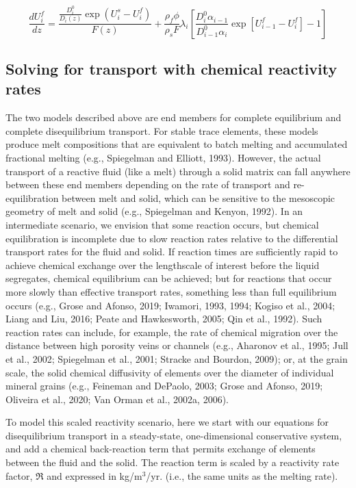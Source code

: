 \documentclass[11pt]{article}
\begin{document}
\begin{equation}
    \frac{dU_{i}^{f}}{dz} = \frac{\frac{D_i^0}{D_i(z)} \exp(U_i^s-U_i^f)}{F(z)} + \frac{\rho_f \phi}{\rho_s F}\lambda_i \left[\frac{D_i^0 \alpha_{i-1}}{D_{i-1}^0 \alpha_i} \exp[U_{i-1}^f - U_i^f]-1\right]\label{eq:28}
\end{equation}

    \hypertarget{solving-for-transport-with-chemical-reactivity-rates}{%
\subsection{Solving for transport with chemical reactivity rates}\label{solving-for-transport-with-chemical-reactivity-rates}}

The two models described above are end members for complete equilibrium and complete disequilibrium transport. For stable trace elements, these models produce melt compositions that are equivalent to batch melting and accumulated fractional melting (e.g., Spiegelman and Elliott, 1993). However, the actual transport of a reactive fluid (like a melt) through a solid matrix can fall anywhere between these end members depending on the rate of transport and re-equilibration between melt and solid, which can be sensitive to the mesoscopic geometry of melt and solid (e.g., Spiegelman and Kenyon, 1992). In an intermediate scenario, we envision that some reaction occurs, but chemical equilibration is incomplete due to slow reaction rates relative to the differential transport rates for the fluid and solid. If reaction times are sufficiently rapid to achieve chemical exchange over the lengthscale of interest before the liquid segregates, chemical equilibrium can be achieved; but for reactions that occur more slowly than effective transport rates, something less than full equilibrium occurs (e.g., Grose and Afonso, 2019; Iwamori, 1993, 1994; Kogiso et al., 2004; Liang and Liu, 2016; Peate and Hawkesworth, 2005; Qin et al., 1992). Such reaction rates can include, for example, the rate of chemical migration over the distance between high porosity veins or channels (e.g., Aharonov et al., 1995; Jull et al., 2002; Spiegelman et al., 2001; Stracke and Bourdon, 2009); or, at the grain scale, the solid chemical diffusivity of elements over the diameter of individual mineral grains (e.g., Feineman and DePaolo, 2003; Grose and Afonso, 2019; Oliveira et al., 2020; Van Orman et al., 2002a, 2006).

To model this scaled reactivity scenario, here we start with our equations for disequilibrium transport in a steady-state, one-dimensional conservative system, and add a chemical back-reaction term that permits exchange of elements between the fluid and the solid. The reaction term is scaled by a reactivity rate factor, $\Re$ and expressed in kg/m$^3$/yr. (i.e., the same units as the melting rate).
\end{document}
